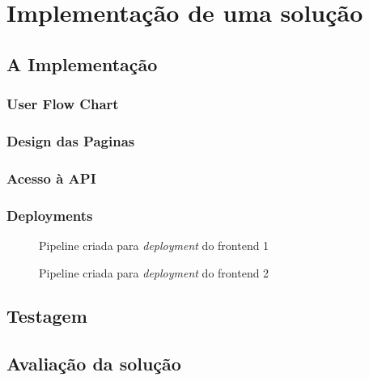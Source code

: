 \chapter{Implementação de uma solução}

\section{A Implementação}

\subsection{User Flow Chart}

\subsection{Design das Paginas}

\subsection{Acesso à API}

\subsection{Deployments}

\begin{figure}
\label{fig:pipeline-fe-1}

\caption{Pipeline criada para \textit{deployment} do frontend 1}
\end{figure}

\begin{figure}
\label{fig:pipeline-fe-2}

\caption{Pipeline criada para \textit{deployment} do frontend 2}
\end{figure}

\section{Testagem}

\section{Avaliação da solução}